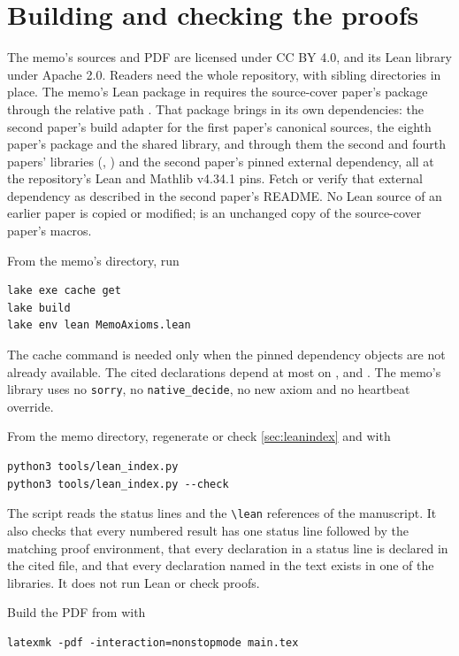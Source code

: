 \section{Building and checking the proofs}\label{sec:verification}

The memo's sources and PDF are licensed under CC BY 4.0, and its Lean library under
Apache 2.0. Readers need the whole repository, with sibling directories in place. The
memo's Lean package in  requires the source-cover paper's
package through the relative path . That package brings in its own
dependencies: the second paper's build adapter for the first paper's canonical sources,
the eighth paper's  package and the shared 
library, and through them the second and fourth papers' libraries
(, ) and the second paper's pinned external
dependency, all at the repository's Lean and Mathlib v4.34.1 pins. Fetch or verify that
external dependency as described in the second paper's README. No Lean source of an
earlier paper is copied or modified;  is an unchanged copy of the
source-cover paper's macros.

From the memo's  directory, run
\begin{verbatim}
lake exe cache get
lake build
lake env lean MemoAxioms.lean
\end{verbatim}
The cache command is needed only when the pinned dependency objects are not already
available. The cited declarations depend at most on ,
 and . The memo's library uses no
\texttt{sorry}, no \texttt{native\_decide}, no new axiom and no heartbeat override.

From the memo directory, regenerate or check \cref{sec:leanindex} and
 with
\begin{verbatim}
python3 tools/lean_index.py
python3 tools/lean_index.py --check
\end{verbatim}
The script reads the status lines and the \texttt{\textbackslash lean} references of
the manuscript. It also checks that every numbered result has one status line followed
by the matching proof environment, that every declaration in a status line is declared
in the cited file, and that every declaration named in the text exists in one of the
libraries. It does not run Lean or check proofs.

Build the PDF from  with
\begin{verbatim}
latexmk -pdf -interaction=nonstopmode main.tex
\end{verbatim}
